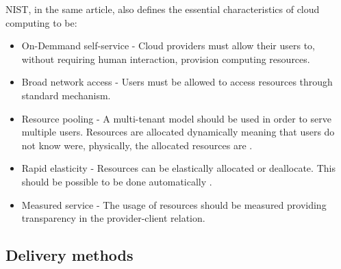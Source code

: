         NIST, in the same article, also defines the essential characteristics of cloud computing to be:
        \begin{itemize}
			\item{On-Demmand self-service} - Cloud providers must allow their users to, without requiring human interaction, provision computing resources.
            \item{Broad network access} - Users must be allowed to access resources through standard mechanism. 
            \item{Resource pooling} - A multi-tenant model should be used in order to serve multiple users. Resources are allocated dynamically meaning that users do not know were, physically, the allocated resources are \cite{Garrison2012}.
            
            \item{Rapid elasticity} - Resources can be elastically allocated or deallocate. This should be possible to be done automatically \cite{Garrison2012,Mell2011}.
            
            \item{Measured service} - The usage of resources should be measured providing transparency in the provider-client relation.

		\end{itemize}
        
        \subsection{Delivery methods}
        
